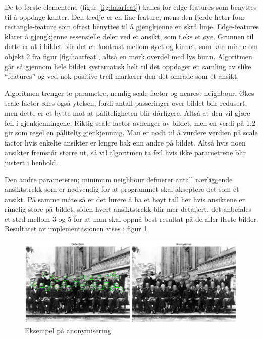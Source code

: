 De to første elementene (figur \ref{fig:haarfeat}) kalles for edge-features som benyttes til å oppdage kanter. Den tredje er en line-feature, mens den fjerde heter four rectangle-feature som oftest benyttes til å gjengkjenne en skrå linje. Edge-features klarer å gjengkjenne essensielle deler ved et ansikt, som f.eks et øye. Grunnen til dette er at i bildet blir det en kontrast mellom øyet og kinnet, som kan minne om objekt 2 fra figur \ref{fig:haarfeat}, altså en mørk overdel med lys bunn. Algoritmen går så gjennom hele bildet systematisk helt til det oppdager en samling av slike ``features'' og ved nok positive treff markerer den det område som et ansikt.

Algoritmen trenger to parametre, nemlig scale factor og nearest neighbour. Økes scale factor økes også ytelsen, fordi antall passeringer over bildet blir redusert, men dette er et bytte mot at påliteligheten blir dårligere. Altså at den vil gjøre feil i gjenkjenningene. Riktig scale factor avhenger av bildet, men en verdi på 1.2 gir som regel en pålitelig gjenkjenning. Man er nødt til å vurdere verdien på scale factor hvis enkelte ansikter er lengre bak enn andre på bildet. Altså hvis noen ansikter fremstår større ut, så vil algoritmen ta feil hvis ikke parametrene blir justert i henhold.

Den andre parameteren; minimum neighbour definerer antall nærliggende ansiktstrekk som er nødvendig for at programmet skal akseptere det som et ansikt. På samme måte så er det lurere å ha et høyt tall her hvis ansiktene er rimelig store på bildet, siden hvert ansiktstrekk blir mer detaljert. det anbefales et sted mellom 3 og 5 for at man skal oppnå best resultat på de aller fleste bilder. Resultatet av implementasjonen vises i figur \ref{fig:science}
\begin{figure}[H]
\begin{center}
 \includegraphics[width=1\columnwidth]{bilder/Anonymisering/faceDetectionExample.png}
     \caption{Eksempel på anonymisering \label{fig:science}} 
\end{center}
\end{figure}

